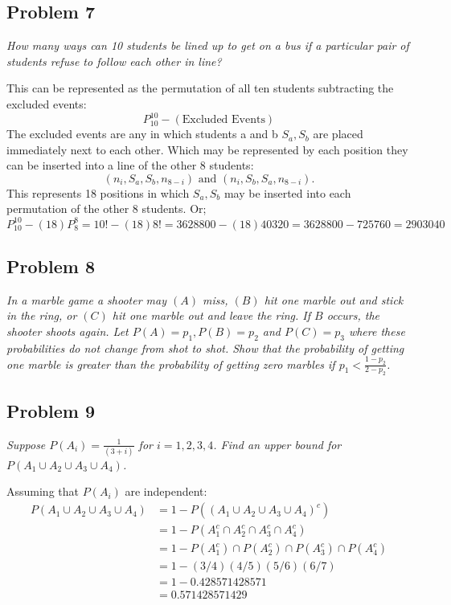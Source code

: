\documentclass[a4paper,man,natbib]{apa6}
\begin{document}
\subsection{Problem 7}
\emph{How many ways can 10 students be lined up to get on a bus if a particular pair of students refuse to follow each other in line?}\vspace{1em}

This can be represented as the permutation of all ten students subtracting the excluded events:
$$ P^{10}_{10} - (\text{Excluded Events})$$
The excluded events are any in which students a and b $S_a, S_b$ are placed immediately next to each other. Which may be represented by each position they can be inserted into a line of the other 8 students:
$$ (n_i, S_a, S_b, n_{8-i})\text{ and  }(n_i, S_b, S_a, n_{8-i}).$$
This represents 18 positions in which  $S_a, S_b$ may be inserted into each permutation of the other 8 students. Or;
$$P^{10}_{10} - (18)P^{8}_{8}  = 10! - (18)8! = 3628800 - (18)40320 = 3628800 - 725760 = 2903040$$

\subsection{Problem 8}
\emph{ 
	In a marble game a shooter may $(A)$ miss, $(B)$ hit one marble out and stick in the ring, or $(C)$ hit one marble out and leave the ring. If $B$ occurs, the shooter shoots again. Let  $P(A)=p_1, P(B)=p_2$ and $P(C)=p_3$ where these probabilities do not change from shot to shot. Show that the probability of getting one marble is greater than the probability of getting zero marbles if $p_1 < \frac{1-p_2}{2-p_2}$. }\vspace{1em}



\subsection{Problem 9}
\emph{Suppose $P(A_i )= \frac{1}{(3+i)}$ for $i=1,2,3,4$. 
	Find an upper bound for $P(A_1 \cup A_2 \cup A_3 \cup A_4)$. }\vspace{1em}

Assuming that $P(A_i )$ are independent:
\begin{align*}
	P(A_1 \cup A_2 \cup A_3 \cup A_4)
	&= 1-P((A_1 \cup A_2 \cup A_3 \cup A_4)^c) \\
	&= 1-P(A_1^c \cap A_2^c \cap A_3^c \cap A_4^c) \\
	&= 1-P(A_1^c)\cap P(A_2^c)\cap P(A_3^c) \cap P(A_4^c) \\
	&= 1-(3/4)(4/5)(5/6)(6/7) \\
	&= 1- 0.428571428571 \\
	&= 0.571428571429
\end{align*}
\end{document}
